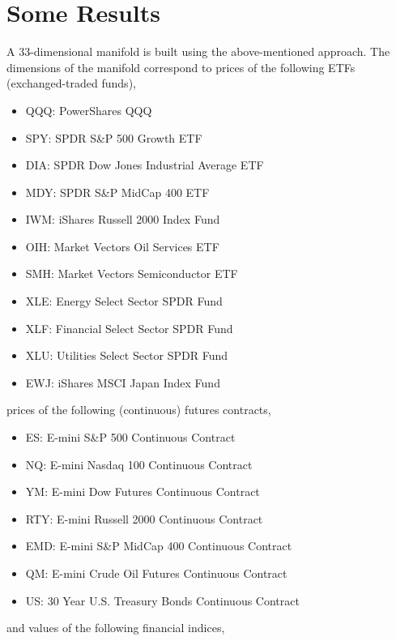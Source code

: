 \documentclass{article}
\begin{document}
\section{Some Results}\label{section:results}

A 33-dimensional manifold is built using the above-mentioned
approach. The dimensions of the manifold correspond to prices of the
following ETFs (exchanged-traded funds),

\begin{itemize}
    \item[] QQQ: PowerShares QQQ 
    \item[] SPY: SPDR S\&P 500 Growth ETF 
    \item[] DIA: SPDR Dow Jones Industrial Average ETF 
    \item[] MDY: SPDR S\&P MidCap 400 ETF 
    \item[] IWM: iShares Russell 2000 Index Fund 
    \item[] OIH: Market Vectors Oil Services ETF 
    \item[] SMH: Market Vectors Semiconductor ETF 
    \item[] XLE: Energy Select Sector SPDR Fund 
    \item[] XLF: Financial Select Sector SPDR Fund 
    \item[] XLU: Utilities Select Sector SPDR Fund 
    \item[] EWJ: iShares MSCI Japan Index Fund
\end{itemize}

prices of the following (continuous) futures contracts,

\begin{itemize}
    \item[] ES:  E-mini S\&P 500 Continuous Contract 
    \item[] NQ:  E-mini Nasdaq 100 Continuous Contract 
    \item[] YM:  E-mini Dow Futures Continuous Contract 
    \item[] RTY: E-mini Russell 2000 Continuous Contract 
    \item[] EMD: E-mini S\&P MidCap 400 Continuous Contract 
    \item[] QM:  E-mini Crude Oil Futures Continuous Contract 
    \item[] US:  30 Year U.S. Treasury Bonds Continuous Contract    
\end{itemize}

and values of the following financial indices,
\end{document}
